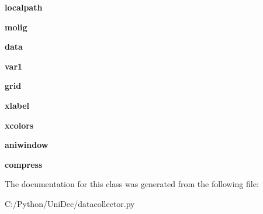 \begin{DoxyCompactItemize}
\item 
\hypertarget{class_uni_dec_1_1datacollector_1_1_data_collector_acd09338df32d05542078162d44159d5c}{}{\bfseries localpath}\label{class_uni_dec_1_1datacollector_1_1_data_collector_acd09338df32d05542078162d44159d5c}

\item 
\hypertarget{class_uni_dec_1_1datacollector_1_1_data_collector_a7c0b47812944b43fb499b0b5cfaa0eb3}{}{\bfseries molig}\label{class_uni_dec_1_1datacollector_1_1_data_collector_a7c0b47812944b43fb499b0b5cfaa0eb3}

\item 
\hypertarget{class_uni_dec_1_1datacollector_1_1_data_collector_a0e7391041d8cdff0620e6d31f4b02264}{}{\bfseries data}\label{class_uni_dec_1_1datacollector_1_1_data_collector_a0e7391041d8cdff0620e6d31f4b02264}

\item 
\hypertarget{class_uni_dec_1_1datacollector_1_1_data_collector_aa4c3242818af3be827dad1c1cc3ee7de}{}{\bfseries var1}\label{class_uni_dec_1_1datacollector_1_1_data_collector_aa4c3242818af3be827dad1c1cc3ee7de}

\item 
\hypertarget{class_uni_dec_1_1datacollector_1_1_data_collector_ab0281a03a8e02ccab5858ee158045bc9}{}{\bfseries grid}\label{class_uni_dec_1_1datacollector_1_1_data_collector_ab0281a03a8e02ccab5858ee158045bc9}

\item 
\hypertarget{class_uni_dec_1_1datacollector_1_1_data_collector_ac40d8ecd3748ed5e36a71a8ae7881c85}{}{\bfseries xlabel}\label{class_uni_dec_1_1datacollector_1_1_data_collector_ac40d8ecd3748ed5e36a71a8ae7881c85}

\item 
\hypertarget{class_uni_dec_1_1datacollector_1_1_data_collector_afd5cfb4c862c7bc2d5a0c24b543fe651}{}{\bfseries xcolors}\label{class_uni_dec_1_1datacollector_1_1_data_collector_afd5cfb4c862c7bc2d5a0c24b543fe651}

\item 
\hypertarget{class_uni_dec_1_1datacollector_1_1_data_collector_a7530ae9e6c824d6aa94d3fff568b6e8d}{}{\bfseries aniwindow}\label{class_uni_dec_1_1datacollector_1_1_data_collector_a7530ae9e6c824d6aa94d3fff568b6e8d}

\item 
\hypertarget{class_uni_dec_1_1datacollector_1_1_data_collector_ab2a7c7080754951e2b597fa6f9f847b4}{}{\bfseries compress}\label{class_uni_dec_1_1datacollector_1_1_data_collector_ab2a7c7080754951e2b597fa6f9f847b4}

\end{DoxyCompactItemize}


The documentation for this class was generated from the following file\+:\begin{DoxyCompactItemize}
\item 
C\+:/\+Python/\+Uni\+Dec/datacollector.\+py\end{DoxyCompactItemize}
